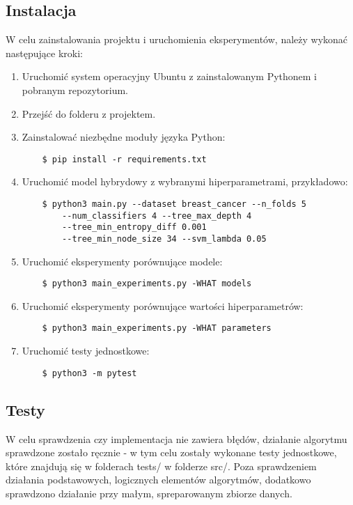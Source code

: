 \documentclass[
    left=2.5cm,         %
    right=2.5cm,        %
    top=2.5cm,          %
    bottom=3cm,         %
    bindingoffset=6mm,  %
    nohyphenation=false %
]{eiti/eiti-report}
\begin{document}
\subsection{Instalacja}
W celu zainstalowania projektu i uruchomienia eksperymentów, należy wykonać następujące kroki:
\begin{enumerate}
    \item Uruchomić system operacyjny Ubuntu z zainstalowanym Pythonem i pobranym repozytorium.
    \item Przejść do folderu z projektem.
    \item Zainstalować niezbędne moduły języka Python:
    \begin{lstlisting}
    $ pip install -r requirements.txt
    \end{lstlisting}
    \item Uruchomić model hybrydowy z wybranymi hiperparametrami, przykładowo:
    \begin{lstlisting}
    $ python3 main.py --dataset breast_cancer --n_folds 5
        --num_classifiers 4 --tree_max_depth 4 
        --tree_min_entropy_diff 0.001 
        --tree_min_node_size 34 --svm_lambda 0.05 
    \end{lstlisting}
    \item Uruchomić eksperymenty porównujące modele:
    \begin{lstlisting}
    $ python3 main_experiments.py -WHAT models
    \end{lstlisting}
    \item Uruchomić eksperymenty porównujące wartości hiperparametrów:
    \begin{lstlisting}
    $ python3 main_experiments.py -WHAT parameters
    \end{lstlisting}
    \item Uruchomić testy jednostkowe:
    \begin{lstlisting}
    $ python3 -m pytest
    \end{lstlisting}
    
\end{enumerate}
\subsection{Testy}
W celu sprawdzenia czy implementacja nie zawiera błędów, działanie algorytmu sprawdzone zostało ręcznie - w tym celu zostały wykonane testy jednostkowe, które znajdują się w folderach tests/ w folderze src/. Poza sprawdzeniem działania podstawowych, logicznych elementów algorytmów, dodatkowo sprawdzono działanie przy małym, spreparowanym zbiorze danych.
\end{document}
